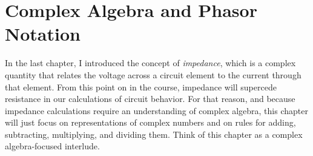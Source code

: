 \chapter{Complex Algebra and Phasor Notation}
\label{chap:complexAlgebra}
In the last chapter, I introduced the concept of \textit{impedance}, which is a complex quantity that relates the voltage across a circuit element to the current through that element. From this point on in the course, impedance will supercede resistance in our calculations of circuit behavior. For that reason, and because impedance calculations require an understanding of complex algebra, this chapter will just focus on representations of complex numbers and on rules for adding, subtracting, multiplying, and dividing them. Think of this chapter as a complex algebra-focused interlude. 

